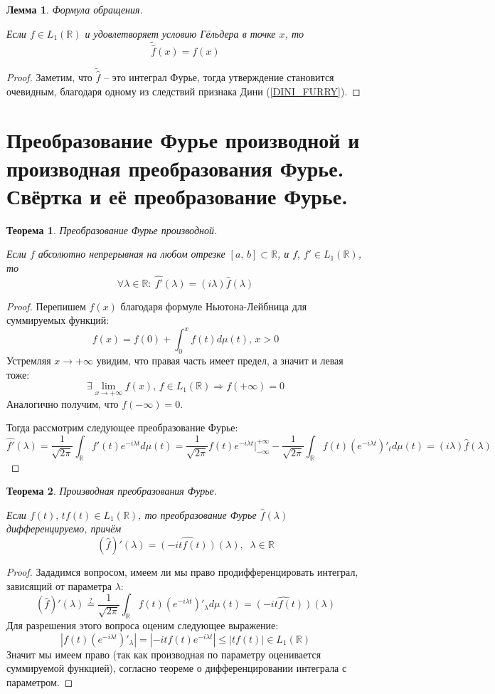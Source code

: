 \documentclass[a4paper,12pt]{article}
\renewcommand{\leq}{\ensuremath{\leqslant}}
\theoremstyle{plain}
\newtheorem{theorem}{Теорема}[section]
\newtheorem{lemma}{Лемма}[section]
\theoremstyle{definition}
\theoremstyle{remark}
\begin{document}
\begin{lemma}
	Формула обращения.

	Если $f \in L_1(\mathbb{R})$ и удовлетворяет условию Гёльдера в точке $x$, то 
	\[\tilde{\hat{f}}(x) = f(x)\]
\end{lemma}

\begin{proof}
	Заметим, что $\tilde{\hat{f}}$ -- это интеграл Фурье, тогда утверждение становится очевидным, благодаря одному из следствий признака Дини (\ref{DINI_FURRY}).
\end{proof}

\section{Преобразование Фурье производной и производная преобразования Фурье. Свёртка и её преобразование Фурье.}
\begin{theorem}
	Преобразование Фурье производной.

	Если $f$ абсолютно непрерывная на любом отрезке $[a,\,b] \subset \mathbb{R}$, и $f,\, f' \in L_1(\mathbb{R})$, то
	\[\forall \lambda \in \mathbb{R}:\: \hat{f'}(\lambda) = (i\lambda)\hat{f}(\lambda)\]
\end{theorem}
\begin{proof}
	Перепишем $f(x)$ благодаря формуле Ньютона-Лейбница для суммируемых функций:
	\[f(x) = f(0) + \int_0^x f(t)d\mu(t),\, x > 0\]
	Устремляя $x \to +\infty$ увидим, что правая часть имеет предел, а значит и левая тоже:
	\[\exists \lim_{x \to +\infty}f(x),\, f \in L_1(\mathbb{R}) \Rightarrow f
	(+\infty) = 0\]
	Аналогично получим, что $f(-\infty) = 0$.

	Тогда рассмотрим следующее преобразование Фурье:
	\[\hat{f'}(\lambda) = \frac{1}{\sqrt{2\pi}}\int_\mathbb{R}f'(t)e^{-i\lambda t}d\mu(t) = \frac{1}{\sqrt{2\pi}}f(t)e^{-i\lambda t}|_{-\infty}^{+\infty} - \frac{1}{\sqrt{2\pi}}\int_\mathbb{R}f(t)(e^{-i\lambda t})'_td\mu(t) = (i\lambda)\hat{f}(\lambda)\]
\end{proof}

\begin{theorem}
	Производная преобразования Фурье.

	Если $f(t),\, tf(t) \in L_1(\mathbb{R})$, то преобразование Фурье $\hat{f}(\lambda)$ дифференцируемо, причём
	\[(\hat{f})'(\lambda) = \widehat{(-itf(t))}(\lambda),\;\; \lambda \in \mathbb{R}\]
\end{theorem}
\begin{proof}
	Зададимся вопросом, имеем ли мы право продифференцировать интеграл, зависящий от параметра $\lambda$:
	\[(\hat{f})'(\lambda) \stackrel{?}{=} \frac{1}{\sqrt{2\pi}}\int_\mathbb{R}f(t)(e^{-i\lambda t})'_\lambda d\mu(t) = \widehat{(-itf(t))}(\lambda)\]
	Для разрешения этого вопроса оценим следующее выражение:
	\[\left|f(t)(e^{-i\lambda t})'_\lambda\right| = \left|-itf(t)e^{-i\lambda t}\right| \leq |tf(t)| \in L_1(\mathbb{R})\]
	Значит мы имеем право (так как производная по параметру оценивается суммируемой функцией), согласно теореме о дифференцировании интеграла с параметром.
\end{proof}
\end{document}
